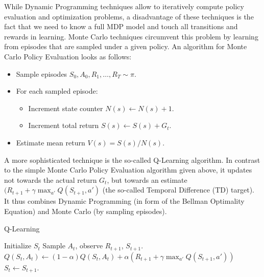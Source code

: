 While Dynamic Programming techniques allow to iteratively compute policy evaluation and optimization problems, a disadvantage of these techniques is the fact that we need to know a full MDP model and touch all transitions and rewards in learning. Monte Carlo techniques circumvent this problem by learning from episodes that are sampled under a given policy. An algorithm for Monte Carlo Policy Evaluation looks as follows: 
\begin{itemize}
  \item Sample episodes $S_0, A_0, R_1, \ldots, R_T \sim \pi$.
    \item For each sampled episode:
  \begin{itemize}
  \item Increment state counter $N(s) \leftarrow N(s) + 1$.
  \item Increment total return $S(s) \leftarrow S(s) + G_t$.
    \end{itemize}
  \item Estimate mean return $V(s) = S(s)/N(s)$.
  \end{itemize}

A more sophisticated technique is the so-called Q-Learning algorithm. In contrast to the simple Monte Carlo Policy Evaluation algorithm given above, it updates not towards the actual return $G_t$, but towards an estimate $(R_{t+1} + \gamma \max_{a'} Q(S_{t+1},a')$ (the so-called Temporal Difference (TD) target). It thus combines Dynamic Programming (in form of the Bellman Optimality Equation) and Monte Carlo (by sampling episodes).

\begin{algorithm}[h!]
\label{algo:q-learning}
   \caption{Q-Learning}
\begin{algorithmic}[1]
\STATE Initialize $S_t$
\STATE Sample $A_t$, observe $R_{t+1}$, $S_{t+1}$.
\STATE $Q(S_t,A_t) \leftarrow (1 - \alpha) Q(S_t,A_t) + \alpha (R_{t+1} + \gamma \max_{a'} Q(S_{t+1},a'))$
\STATE $S_t \leftarrow S_{t+1}$.
\ENDFOR
	\ENDFOR
\end{algorithmic}
\end{algorithm}


